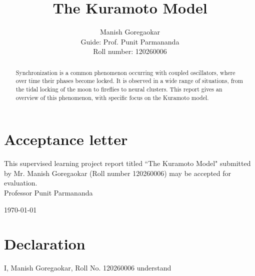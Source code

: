 \documentclass[12pt]{article}
\begin{document}
\title{The Kuramoto Model}
\author{Manish Goregaokar\\{\small Guide: Prof. Punit Parmananda} \\ {\small Roll number: 120260006}}

\maketitle

\begin{abstract}
Synchronization is a common phenomenon occurring with coupled oscillators, where over time their phases become locked. It is observed in a wide range of situations, from the tidal locking of the moon to fireflies to neural clusters. This report gives an overview of this phenomenon, with specific focus on the Kuramoto model.
\end{abstract}
\pagebreak
{}
\section*{Acceptance letter}
This supervised learning project report titled ``The Kuramoto Model" submitted by Mr. Manish Goregaokar (Roll number 120260006) may be accepted for evaluation.\\

\hfill Professor Punit Parmananda

\hfill \today
\pagebreak
{}
\section*{Declaration}
 I, Manish Goregaokar, Roll No. 120260006 understand
\end{document}
